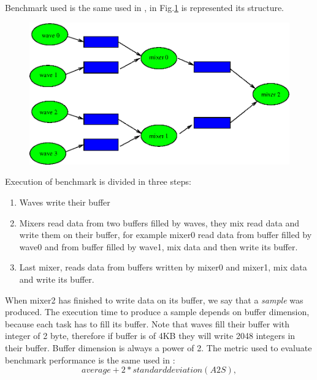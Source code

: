 Benchmark used is the same used in \cite{lcs}, in Fig.\ref{fig:bench} is represented its structure.

\begin{figure}[htbp]
\centering
\includegraphics[width=\widefigure]{images/bench.eps}
\caption{}
\label{fig:bench}
\end{figure}

Execution of benchmark is divided in three steps:

\begin{enumerate}
\item Waves write their buffer
\item Mixers read data from two buffers filled by waves, they mix read data and write them on their buffer, for example mixer0 read data from buffer filled 
by wave0 and from buffer filled by wave1, mix data and then write its buffer.
\item Last mixer, reads data from buffers written by mixer0 and mixer1, mix data and write its buffer.
\end{enumerate}

When mixer2 has finished to write data on its buffer, we say that a \textit{sample} was produced. The execution time to produce a sample depends on buffer 
dimension, because each task has to fill its buffer. Note that waves fill their buffer with integer of 2 byte, therefore if buffer is of 4KB they will
write 2048 integers in their buffer. Buffer dimension is always a power of 2.
The metric used to evaluate benchmark performance is the same used in \cite{lcs}: 
\begin{equation}
	average + 2*standard deviation (A2S), 
\label{eq:metric_rt}
\end{equation}

